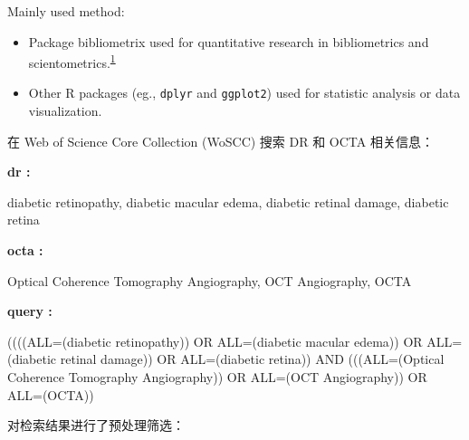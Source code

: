 \documentclass[
]{article}
\providecommand{\tightlist}{%
  \setlength{\itemsep}{0pt}\setlength{\parskip}{0pt}}
\begin{document}
Mainly used method:

\begin{itemize}
\tightlist
\item
  Package bibliometrix used for quantitative research in bibliometrics and scientometrics.\textsuperscript{\protect\hyperlink{ref-BibliometrixAria2017}{1}}
\item
  Other R packages (eg., \texttt{dplyr} and \texttt{ggplot2}) used for statistic analysis or data visualization.
\end{itemize}

在 Web of Science Core Collection (WoSCC) 搜索 DR 和 OCTA 相关信息：

\begin{center}\begin{tcolorbox}[colback=gray!10, colframe=gray!50, width=0.9\linewidth, arc=1mm, boxrule=0.5pt]
\textbf{
dr
:}

\vspace{0.5em}

    diabetic retinopathy, diabetic macular edema, diabetic
retinal damage, diabetic retina

\vspace{2em}


\textbf{
octa
:}

\vspace{0.5em}

    Optical Coherence Tomography Angiography, OCT
Angiography, OCTA

\vspace{2em}


\textbf{
query
:}

\vspace{0.5em}

    ((((ALL=(diabetic retinopathy)) OR ALL=(diabetic
macular edema)) OR ALL=(diabetic retinal damage)) OR
ALL=(diabetic retina)) AND (((ALL=(Optical Coherence
Tomography Angiography)) OR ALL=(OCT Angiography)) OR
ALL=(OCTA))

\vspace{2em}
\end{tcolorbox}
\end{center}

对检索结果进行了预处理筛选：
\end{document}
